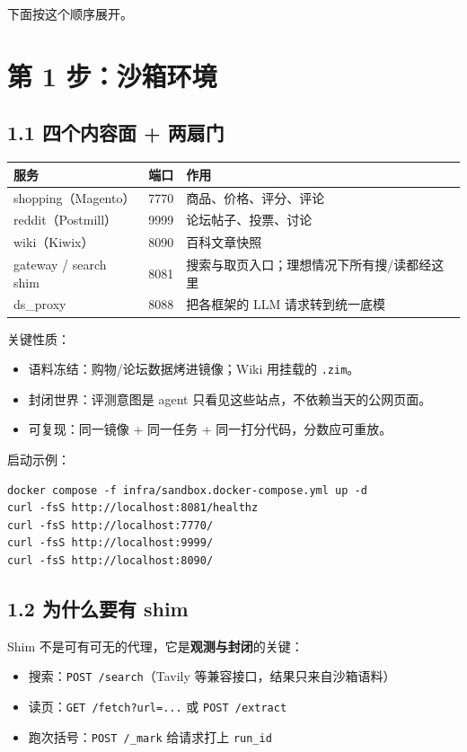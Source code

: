 \documentclass[11pt,a4paper]{article}
\begin{document}
下面按这个顺序展开。

\section{第 1 步：沙箱环境}

\subsection{1.1 四个内容面 + 两扇门}

\begin{center}
\begin{tabular}{@{}llp{7.2cm}@{}}
\toprule
服务 & 端口 & 作用 \\
\midrule
shopping（Magento） & 7770 & 商品、价格、评分、评论 \\
reddit（Postmill） & 9999 & 论坛帖子、投票、讨论 \\
wiki（Kiwix） & 8090 & 百科文章快照 \\
gateway / search shim & 8081 & 搜索与取页入口；理想情况下所有搜/读都经这里 \\
ds\_proxy & 8088 & 把各框架的 LLM 请求转到统一底模 \\
\bottomrule
\end{tabular}
\end{center}

关键性质：
\begin{itemize}[leftmargin=1.5em]
  \item 语料冻结：购物/论坛数据烤进镜像；Wiki 用挂载的 \texttt{.zim}。
  \item 封闭世界：评测意图是 agent 只看见这些站点，不依赖当天的公网页面。
  \item 可复现：同一镜像 + 同一任务 + 同一打分代码，分数应可重放。
\end{itemize}

启动示例：
\begin{lstlisting}
docker compose -f infra/sandbox.docker-compose.yml up -d
curl -fsS http://localhost:8081/healthz
curl -fsS http://localhost:7770/
curl -fsS http://localhost:9999/
curl -fsS http://localhost:8090/
\end{lstlisting}

\subsection{1.2 为什么要有 shim}

Shim 不是可有可无的代理，它是\textbf{观测与封闭}的关键：
\begin{itemize}[leftmargin=1.5em]
  \item 搜索：\texttt{POST /search}（Tavily 等兼容接口，结果只来自沙箱语料）
  \item 读页：\texttt{GET /fetch?url=...} 或 \texttt{POST /extract}
  \item 跑次括号：\texttt{POST /\_mark} 给请求打上 \texttt{run\_id}
\end{itemize}
\end{document}
